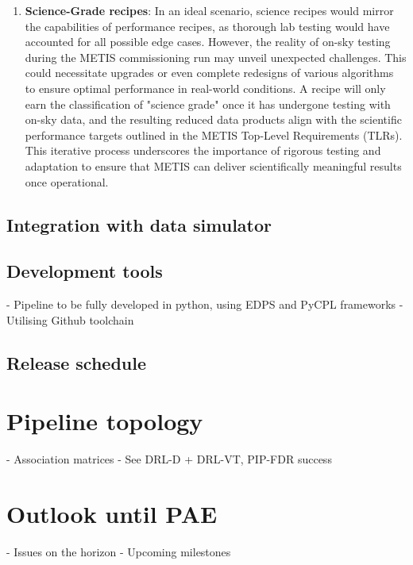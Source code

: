 \documentclass[a4paper]{spie}  %
\begin{document}
\begin{enumerate}
     \item \textbf{Science-Grade recipes}: In an ideal scenario, science recipes would mirror the capabilities of performance recipes, as thorough lab testing would have accounted for all possible edge cases. However, the reality of on-sky testing during the METIS commissioning run may unveil unexpected challenges. This could necessitate upgrades or even complete redesigns of various algorithms to ensure optimal performance in real-world conditions. A recipe will only earn the classification of "science grade" once it has undergone testing with on-sky data, and the resulting reduced data products align with the scientific performance targets outlined in the METIS Top-Level Requirements (TLRs). This iterative process underscores the importance of rigorous testing and adaptation to ensure that METIS can deliver scientifically meaningful results once operational. 
 \end{enumerate}



\subsection{Integration with data simulator}





\subsection{Development tools}
- Pipeline to be fully developed in python, using EDPS and PyCPL frameworks
- Utilising Github toolchain

\subsection{Release schedule}


\section{Pipeline topology}
- Association matrices
- See DRL-D + DRL-VT, PIP-FDR success




\section{Outlook until PAE}
- Issues on the horizon
- Upcoming milestones


\appendix    %

\acknowledgments %


\end{document}
